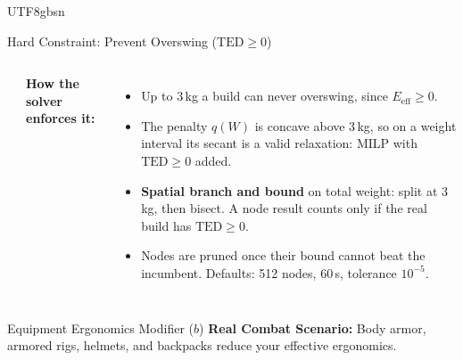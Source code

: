\documentclass[aspectratio=169]{beamer}
\begin{document}
\begin{CJK*}{UTF8}{gbsn}
\begin{frame}{Hard Constraint: Prevent Overswing ($\text{TED} \ge 0$)}
\begin{columns}
\begin{center}
        \end{center}

        \textbf{How the solver enforces it:}
        \begin{itemize}\footnotesize
            \item Up to 3\,kg a build can never overswing, since $E_{\text{eff}} \ge 0$.
            \item The penalty $q(W)$ is concave above 3\,kg, so on a weight interval its secant is a valid relaxation: MILP with $\text{TED} \ge 0$ added.
            \item \textbf{Spatial branch and bound} on total weight: split at 3\,kg, then bisect. A node result counts only if the real build has $\text{TED} \ge 0$.
            \item Nodes are pruned once their bound cannot beat the incumbent. Defaults: 512 nodes, 60\,s, tolerance $10^{-5}$.
        \end{itemize}
    \end{columns}
\end{frame}

\begin{frame}{Equipment Ergonomics Modifier ($b$)}
    \textbf{Real Combat Scenario:} Body armor, armored rigs, helmets, and backpacks reduce your effective ergonomics.


\end{frame}
\end{CJK*}
\end{document}
